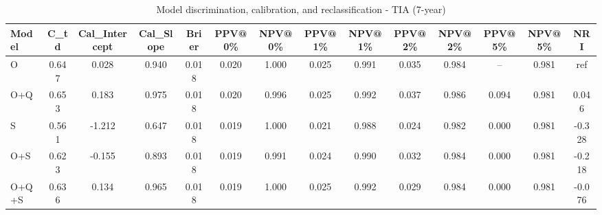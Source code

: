 \begin{table}[htbp]
\centering
\small
\caption{Model discrimination, calibration, and reclassification - TIA (7-year)}
\label{tab:perf_tia_7y}
\begin{tabular}{lccccccccccccc}
\toprule
Model & C\_td & Cal\_Intercept & Cal\_Slope & Brier & PPV@0\% & NPV@0\% & PPV@1\% & NPV@1\% & PPV@2\% & NPV@2\% & PPV@5\% & NPV@5\% & NRI \\
\midrule
O & 0.647 & 0.028 & 0.940 & 0.018 & 0.020 & 1.000 & 0.025 & 0.991 & 0.035 & 0.984 & -- & 0.981 & ref \\
O+Q & 0.653 & 0.183 & 0.975 & 0.018 & 0.020 & 0.996 & 0.025 & 0.992 & 0.037 & 0.986 & 0.094 & 0.981 & 0.046 \\
S & 0.561 & -1.212 & 0.647 & 0.018 & 0.019 & 1.000 & 0.021 & 0.988 & 0.024 & 0.982 & 0.000 & 0.981 & -0.328 \\
O+S & 0.623 & -0.155 & 0.893 & 0.018 & 0.019 & 0.991 & 0.024 & 0.990 & 0.032 & 0.984 & 0.000 & 0.981 & -0.218 \\
O+Q+S & 0.636 & 0.134 & 0.965 & 0.018 & 0.019 & 1.000 & 0.025 & 0.992 & 0.029 & 0.984 & 0.000 & 0.981 & -0.076 \\
\bottomrule
\end{tabular}
\end{table}